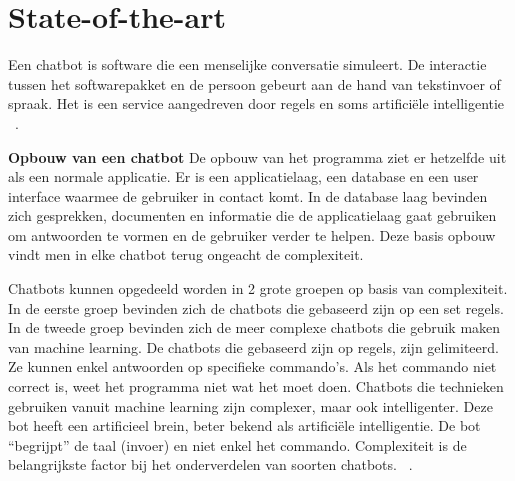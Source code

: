 
\section{State-of-the-art}%
\label{sec:state-of-the-art}

Een chatbot is software die een menselijke conversatie simuleert. De interactie tussen het softwarepakket en de persoon gebeurt aan de hand van tekstinvoer of spraak. Het is een service aangedreven door regels en soms artificiële intelligentie ~\autocite{Schlicht2016}.

\textbf{Opbouw van een chatbot}\newline
De opbouw van het programma ziet er hetzelfde uit als een normale applicatie. Er is een applicatielaag, een database en een user interface waarmee de gebruiker in contact komt.  In de database laag bevinden zich gesprekken, documenten en informatie die de applicatielaag gaat gebruiken om antwoorden te vormen en de gebruiker verder te helpen. Deze basis opbouw vindt men in elke chatbot terug ongeacht de complexiteit. ~\autocite{Techlabs2017} \newline

Chatbots kunnen opgedeeld worden in 2 grote groepen op basis van complexiteit. In de eerste groep bevinden zich de chatbots die gebaseerd zijn op een set regels. In de tweede groep bevinden zich de meer complexe chatbots die gebruik maken van machine learning. De chatbots die gebaseerd zijn op regels, zijn gelimiteerd. Ze kunnen enkel antwoorden op specifieke commando’s. Als het commando niet correct is, weet het programma niet wat het moet doen. Chatbots die technieken gebruiken vanuit machine learning zijn complexer, maar ook intelligenter. Deze bot heeft een artificieel brein, beter bekend als artificiële intelligentie. De bot “begrijpt” de taal (invoer) en niet enkel het commando. Complexiteit is de belangrijkste factor bij het onderverdelen van soorten chatbots. ~\autocite{Schlicht2016}. \newline

